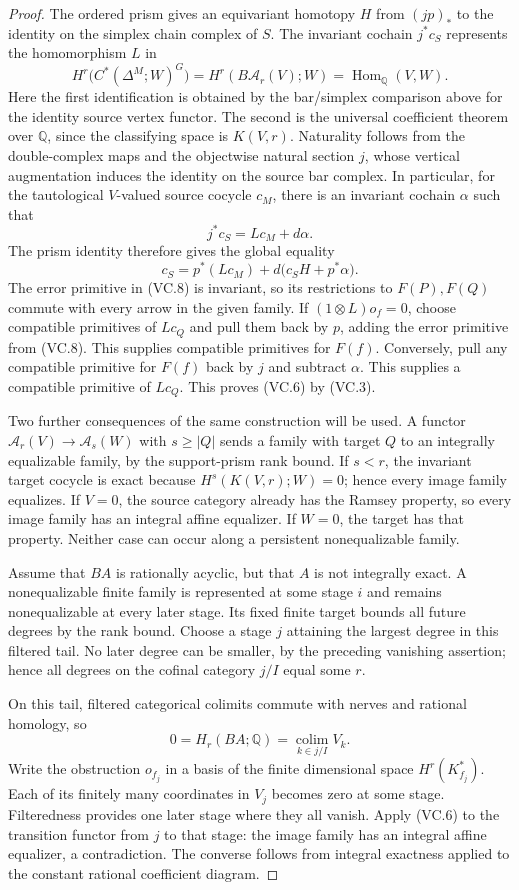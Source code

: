 \begin{proof}
The ordered prism gives an equivariant homotopy $H$ from
$(jp)_*$ to the identity on the simplex chain complex of $S$.
The invariant cochain $j^*c_S$ represents the homomorphism $L$
in
\[
 H^r\bigl(C^*(\Delta^M;W)^G\bigr)
   =H^r(B\mathcal A_r(V);W)
   =\operatorname{Hom}_{\mathbb Q}(V,W).
 \tag{VC.7}
\]
Here the first identification is obtained by the bar/simplex
comparison above for the identity source vertex functor. The second is the
universal coefficient theorem over $\mathbb Q$, since the
classifying space is $K(V,r)$. Naturality follows from the double-complex maps and the
objectwise natural section $j$, whose vertical augmentation
induces the identity on the source bar complex. In particular, for the tautological
$V$-valued source cocycle $c_M$, there is an invariant cochain
$\alpha$ such that
\[
 j^*c_S=Lc_M+d\alpha.
\]
The prism identity therefore gives the global equality
\[
 c_S=p^*(Lc_M)+d\bigl(c_SH+p^*\alpha\bigr).
 \tag{VC.8}
\]
The error primitive in (VC.8) is invariant, so its restrictions
to $F(P),F(Q)$ commute with every arrow in the given family.
If $(1\otimes L)o_f=0$, choose compatible primitives of $Lc_Q$
and pull them back by $p$, adding the error primitive from
(VC.8). This supplies compatible primitives for $F(f)$.
Conversely, pull any compatible primitive for $F(f)$ back by
$j$ and subtract $\alpha$. This supplies a compatible primitive
of $Lc_Q$. This proves (VC.6) by (VC.3).

Two further consequences of the same construction will be used. A functor
$\mathcal A_r(V)\to\mathcal A_s(W)$ with $s\geq|Q|$ sends a
family with target $Q$ to an integrally equalizable family,
by the support-prism rank bound. If $s<r$, the invariant target
cocycle is exact because
$H^s(K(V,r);W)=0$; hence every image family equalizes.
If $V=0$, the source category already has the Ramsey property,
so every image family has an integral affine equalizer. If $W=0$,
the target has that property. Neither case can occur along a
persistent nonequalizable family.

Assume that $BA$ is rationally acyclic, but that $A$ is not
integrally exact. A nonequalizable finite family is represented
at some stage $i$ and remains nonequalizable at every later
stage. Its fixed finite target bounds all future degrees by the
rank bound. Choose a stage $j$ attaining the largest degree in
this filtered tail. No later degree can be smaller, by the
preceding vanishing assertion; hence all degrees on the
cofinal category $j/I$ equal some $r$.

On this tail, filtered categorical colimits commute with nerves
and rational homology, so
\[
 0=H_r(BA;\mathbb Q)=\operatorname*{colim}_{k\in j/I} V_k.
\]
Write the obstruction $o_{f_j}$ in a basis of the finite
dimensional space $H^r(K_{f_j}^*)$. Each of its finitely many
coordinates in $V_j$ becomes zero at some stage. Filteredness
provides one later stage where they all vanish. Apply (VC.6) to
the transition functor from $j$ to that stage: the image family
has an integral affine equalizer, a contradiction.
The converse follows from integral exactness applied to the
constant rational coefficient diagram.
\end{proof}

